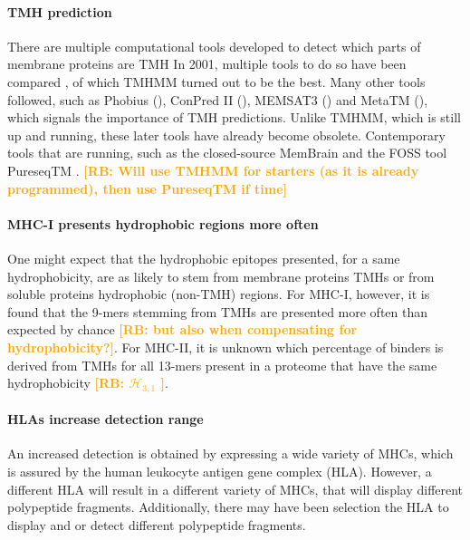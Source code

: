 \documentclass{article}
\newcommand{\richel}[1]{\textcolor{orange}{\textbf{[RB: #1]}}}
\begin{document}
\paragraph{TMH prediction}

There are multiple computational tools developed to detect which
parts of membrane proteins are TMH
In 2001, multiple tools to do so have been compared \cite{moller2001evaluation},
of which TMHMM \cite{krogh2001predicting} turned out to be the best.
Many other tools followed, such as 
Phobius (\cite{kall2004combined}),
ConPred II (\cite{arai2004conpred}),
MEMSAT3 (\cite{jones2007improving})
and MetaTM (\cite{klammer2009metatm}), which signals the importance
of TMH predictions. 
Unlike TMHMM, which is still up and running, 
these later tools have already become obsolete.
Contemporary tools that are running, such as
the closed-source MemBrain \cite{feng2020topology} 
and the FOSS tool PureseqTM \cite{wang2019efficient}.
\richel{Will use TMHMM for starters (as it is already programmed),
then use PureseqTM if time}

\paragraph{MHC-I presents hydrophobic regions more often}

One might expect that the hydrophobic epitopes presented,
for a same hydrophobicity, are as likely to stem from 
membrane proteins TMHs or from soluble proteins hydrophobic (non-TMH) regions.
For MHC-I, however, it is found that the 9-mers stemming
from TMHs are presented more often than expected by 
chance \cite{bianchi2017}
\richel{but also when compensating for hydrophobicity?}.
For MHC-II, it is unknown which percentage of binders 
is derived from TMHs for all 13-mers present in a proteome
that have the same hydrophobicity 
\richel{
  $\mathcal{H}_{3,1}$
}.

\paragraph{HLAs increase detection range}

An increased detection
is obtained by expressing a wide variety of
MHCs, which is assured by the human leukocyte antigen gene complex (HLA).
However, a different HLA will result in a different variety of MHCs,
that will display different polypeptide fragments. Additionally, there
may have been selection the HLA to display and or detect different
polypeptide fragments.
\end{document}
